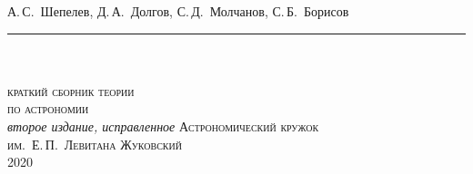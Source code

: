 \thispagestyle{empty}
\begin{center}
	{\sffamily \large А.\,С.~Шепелев, Д.\,А.~Долгов, С.\,Д.~Молчанов, С.\,Б.~Борисов}\\[-7pt]
	
	\rule{0.88\tw}{0.7pt} \\[12pc]

	
	
	\scalebox{2}{\Huge \bfseries \scshape Астрадь}\\[1pc]
	{\Large \scshape краткий сборник теории\\[.5pc] по астрономии}\\[2pc]
	\vfill
	{\slshape второе издание, исправленное}
	\vfill
	{\scshape Астрономический кружок\\ им.~Е.\,П.~Левитана}
	\vfill
	{\scshape Жуковский \\ 2020}
\end{center}